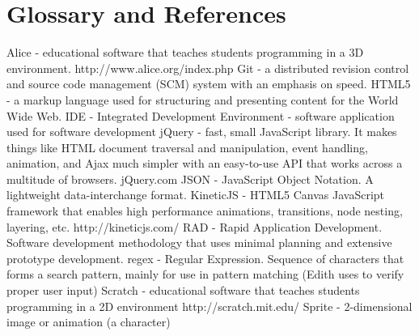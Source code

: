 \documentclass[a4paper]{article}
\begin{document}
	
	\section{Glossary and References}
	
	Alice - educational software that teaches students programming in a 3D environment. http://www.alice.org/index.php \newline \newline
	Git -  a distributed revision control and source code management (SCM) system with an emphasis on speed. \newline \newline
	HTML5 - a markup language used for structuring and presenting content for the World Wide Web. \newline \newline
	IDE - Integrated Development Environment - software application used for software development \newline \newline
	jQuery - fast, small JavaScript library. It makes things like HTML document traversal and manipulation, event handling, animation, and Ajax much simpler with an easy-to-use API that works across a multitude of browsers.  jQuery.com  \newline \newline
	JSON - JavaScript Object Notation. A lightweight data-interchange format. \newline \newline
	KineticJS -  HTML5 Canvas JavaScript framework that enables high performance animations, transitions, node nesting, layering, etc.  http://kineticjs.com/ \newline \newline
	RAD - Rapid Application Development.  Software development methodology that uses minimal planning and extensive prototype development.  \newline \newline
	regex - Regular Expression.  Sequence of characters that forms a search pattern, mainly for use in pattern matching (Edith uses to verify proper user input) \newline \newline
	Scratch - educational software that teaches students programming in a 2D environment http://scratch.mit.edu/ \newline \newline
	Sprite - 2-dimensional image or animation (a character) \newline \newline
	        
\end{document}
